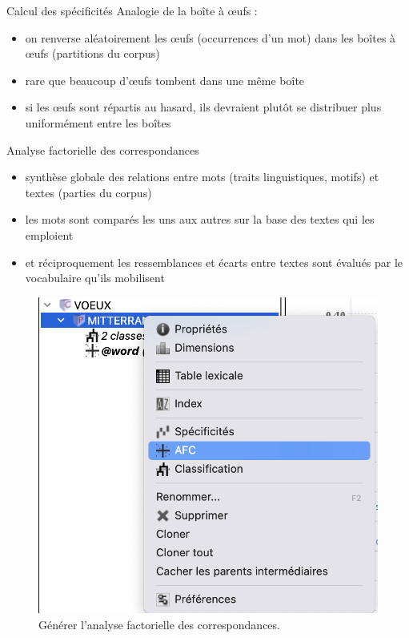 \documentclass[xetex,xcolor={table,usenames,dvipsnames}]{beamer}
\begin{document}
\begin{frame}{Calcul des spécificités}
		Analogie de la boîte à \oe{}ufs :
	\begin{itemize}
		\item on renverse aléatoirement les \oe{}ufs (occurrences d'un mot) dans les boîtes à \oe{}ufs (partitions du corpus)
		\item rare que beaucoup d'œufs tombent dans une même boîte
		\item si les œufs sont répartis au hasard, ils devraient plutôt se distribuer plus uniformément entre les boîtes
	\end{itemize}
\end{frame}

\begin{frame}{Analyse factorielle des correspondances \citep{benzecri1973analyse}}
	\begin{itemize}
		\item synthèse globale des relations entre
		mots (traits linguistiques, motifs) et textes (parties du
		corpus) 
		\item les mots sont comparés les uns aux autres sur la base des textes qui les emploient
		\item et réciproquement les ressemblances et écarts entre textes sont évalués par le vocabulaire qu’ils
		mobilisent
	\end{itemize}
			\begin{figure}[h] %
		\centering
		\includegraphics[width=.3\linewidth]{img/generer_afc.png}
		\caption{Générer l'analyse factorielle des correspondances.}
		\label{fig:ling_out_TAL}
	\end{figure}
\end{frame}
\end{document}
